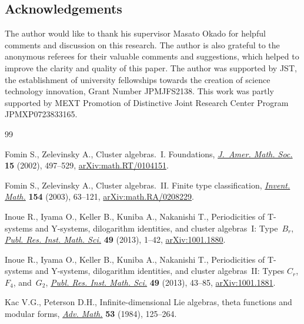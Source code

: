 \documentclass[pdftex]{sigma}
\numberwithin{equation}{section}
\begin{document}
\subsection*{Acknowledgements}

The author would like to thank his supervisor Masato Okado for helpful comments and discussion on this research.
The author is also grateful to the anonymous referees for their valuable comments and suggestions, which helped to improve the clarity and quality of this paper.
The author was supported by JST, the establishment of university fellowships towards the creation of science technology innovation, Grant Number JPMJFS2138.
This work was partly supported by MEXT Promotion of Distinctive Joint Research Center Program JPMXP0723833165.

\begin{thebibliography}{99}
\footnotesize\itemsep=0pt

Fomin S., Zelevinsky A., Cluster algebras.~{I}. {F}oundations, \href{https://doi.org/10.1090/S0894-0347-01-00385-X}{\textit{J.~Amer.
 Math. Soc.}} \textbf{15} (2002), 497--529, \href{https://arxiv.org/abs/math.RT/0104151}{arXiv:math.RT/0104151}.

Fomin S., Zelevinsky A., Cluster algebras.~{II}. {F}inite type classification,
 \href{https://doi.org/10.1007/s00222-003-0302-y}{\textit{Invent. Math.}} \textbf{154} (2003), 63--121,
 \href{https://arxiv.org/abs/math.RA/0208229}{arXiv:math.RA/0208229}.

Inoue R., Iyama O., Keller B., Kuniba A., Nakanishi T., Periodicities of
 {T}-systems and {Y}-systems, dilogarithm identities, and cluster
 algebras~{I}: {T}ype~{$B_r$}, \href{https://doi.org/10.4171/PRIMS/95}{\textit{Publ. Res. Inst. Math. Sci.}}
 \textbf{49} (2013), 1--42, \href{https://arxiv.org/abs/1001.1880}{arXiv:1001.1880}.

Inoue R., Iyama O., Keller B., Kuniba A., Nakanishi T., Periodicities of
 {T}-systems and {Y}-systems, dilogarithm identities, and cluster
 algebras~{II}: {T}ypes {$C_r$}, {$F_4$}, and~{$G_2$}, \href{https://doi.org/10.4171/PRIMS/96}{\textit{Publ. Res.
 Inst. Math. Sci.}} \textbf{49} (2013), 43--85, \href{https://arxiv.org/abs/1001.1881}{arXiv:1001.1881}.

Kac V.G., Peterson D.H., Infinite-dimensional {L}ie algebras, theta functions
 and modular forms, \href{https://doi.org/10.1016/0001-8708(84)90032-X}{\textit{Adv. Math.}} \textbf{53} (1984), 125--264.


\end{thebibliography}
\end{document}
